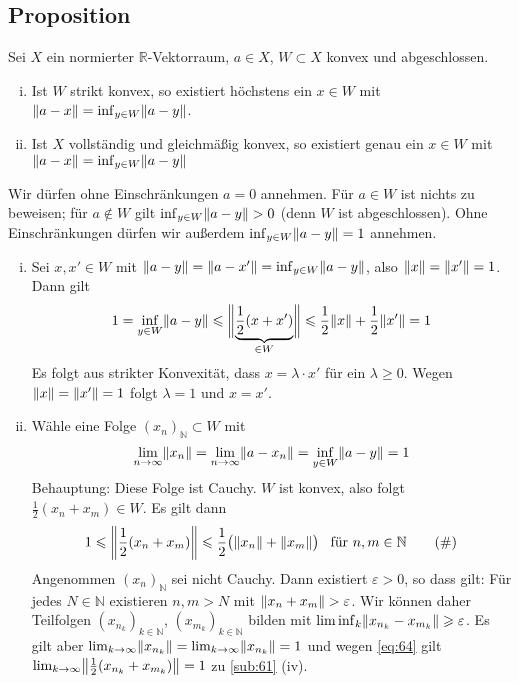 \subsection{Proposition} %
\label{sub:64}
Sei $X$ ein normierter $\mathds{R}$-Vektorraum, $a \in X$, $W \subset X$ konvex und abgeschlossen. 
\begin{enumerate}[(i)]
	\item Ist $W$ strikt konvex, so existiert höchstens ein $x \in W$ mit $\norm{a -x}= \inf_{y \in W} \norm{a-y}$.
	\item Ist $X$ vollständig und gleichmäßig konvex, so existiert genau ein $x \in W$ mit $\norm{a-x}= \inf_{y \in W} \norm{a-y}$
\end{enumerate}
Wir dürfen ohne Einschränkungen $a=0$ annehmen. Für $a \in W$ ist nichts zu beweisen; für $a \not\in W$ gilt $\inf_{y \in W} \norm{a-y} >0$ (denn $W$ ist abgeschlossen).
Ohne Einschränkungen dürfen wir außerdem $\inf_{y \in W} \norm{a-y}=1$ annehmen. 
\begin{enumerate}[(i)]
	\item Sei $x,x' \in W$ mit $\norm{a-y}= \norm{a-x'}= \inf_{y \in W} \norm{a-y}$, also $\norm{x}=\norm{x'}=1$. Dann gilt 
	\[
		1= \inf_{y \in W} \norm{a-y} \le \doppelstrich[\bigg]{\underbrace{\frac{1}{2} (x+x')}_{\in W}} \le \frac{1}{2} \norm{x} + \frac{1}{2} \norm{x'} =1   
	\]
	Es folgt aus strikter Konvexität, dass $x=\lambda \cdot x'$ für ein $\lambda \ge 0$. Wegen $\norm{x}=\norm{x'}=1$ folgt $\lambda=1$ und $x=x'$. 
	\item Wähle eine Folge $(x_n)_{\mathds{N}} \subset W$ mit 
	\[
		\lim_{ n \to \infty} \norm{x_n} = \lim_{ n \to \infty} \norm{a-x_n} = \inf_{y \in W} \norm{a-y} = 1 
	\]
	Behauptung: Diese Folge ist Cauchy. $W$ ist konvex, also folgt $\frac{1}{2} (x_n+x_m) \in W$. Es gilt dann 
	\begin{equation*}
		1 \le \norm{\frac{1}{2}(x_n+x_m)} \le \frac{1}{2} \enbrace[\big]{\norm{x_n}+ \norm{x_m}} \enspace\text{ für } n,m \in \mathds{N} \label{eq:64} \tag{\#}
	\end{equation*}
	Angenommen $(x_n)_\mathds{N}$ sei nicht Cauchy. Dann existiert $\varepsilon>0$, so dass gilt: Für jedes $N \in \mathds{N}$ existieren $n,m >N$ mit 
	$\norm{x_n +x_m} >\varepsilon$. Wir können daher Teilfolgen $(x_{n_k})_{k \in \mathds{N}}$, $(x_{m_k})_{k \in \mathds{N}}$ bilden mit 
	$\liminf_k \norm{x_{n_k} - x_{m_k}} \ge \varepsilon$. Es gilt aber $\lim_{ k \to \infty} \norm{x_{n_k}} = \lim_{ k \to \infty} \norm{x_{n_k}}=1$ und wegen \eqref{eq:64}
	gilt $\lim_{ k \to \infty} \norm{\frac{1}{2} (x_{n_k} + x_{m_k})} = 1$ \light zu \ref{sub:61} (iv). \bewende
\end{enumerate}

